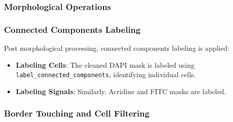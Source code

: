 \documentclass[a4paper,12pt]{article}
\begin{document}
\subsubsection{Morphological Operations}


\subsubsection{Connected Components Labeling}

Post morphological processing, connected components labeling is applied:
\begin{itemize}
    \item \textbf{Labeling Cells}: The cleaned DAPI mask is labeled using \texttt{label\_connected\_components}, identifying individual cells.
    \item \textbf{Labeling Signals}: Similarly, Acridine and FITC masks are labeled.
\end{itemize}

\subsubsection{Border Touching and Cell Filtering}

\end{document}
